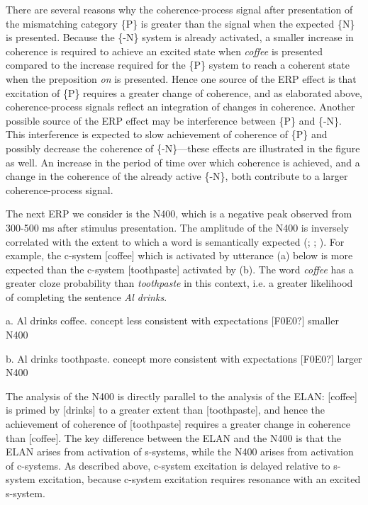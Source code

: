There are several reasons why the coherence-process signal after presentation of the mismatching category \{P\} is greater than the signal when the expected \{N\} is presented. Because the \{-N\} system is already activated, a smaller increase in coherence is required to achieve an excited state when \textit{coffee} is presented compared to the increase required for the \{P\} system to reach a coherent state when the preposition \textit{on} is presented. Hence one source of the ERP effect is that excitation of \{P\} requires a greater change of coherence, and as elaborated above, coherence-process signals reflect an integration of changes in coherence. Another possible source of the ERP effect may be interference between \{P\} and \{-N\}. This interference is expected to slow achievement of coherence of \{P\} and possibly decrease the coherence of \{-N\}—these effects are illustrated in the figure as well. An increase in the period of time over which coherence is achieved, and a change in the coherence of the already active \{-N\}, both contribute to a larger coherence-process signal.

  The next ERP we consider is the N400, which is a negative peak observed from 300-500 ms after stimulus presentation. The amplitude of the N400 is inversely correlated with the extent to which a word is semantically expected (\citealt{FedermeierLaszlo2009}; \citealt{Friederici2002}; \citealt{KutasFedermeier2011}). For example, the c-system [coffee] which is activated by utterance (a) below is more expected than the c-system [toothpaste] activated by (b). The word \textit{coffee} has a greater cloze probability than \textit{toothpaste} in this context, i.e. a greater likelihood of completing the sentence \textit{Al drinks}.

a. Al drinks coffee.         concept less consistent with expectations [F0E0?] smaller N400

b. Al drinks toothpaste.    concept more consistent with expectations [F0E0?] larger N400

The analysis of the N400 is directly parallel to the analysis of the ELAN: [coffee] is primed by [drinks] to a greater extent than [toothpaste], and hence the achievement of coherence of [toothpaste] requires a greater change in coherence than [coffee]. The key difference between the ELAN and the N400 is that the ELAN arises from activation of s-systems, while the N400 arises from activation of c-systems. As described above, c-system excitation is delayed relative to s-system excitation, because c-system excitation requires resonance with an excited s-system.

